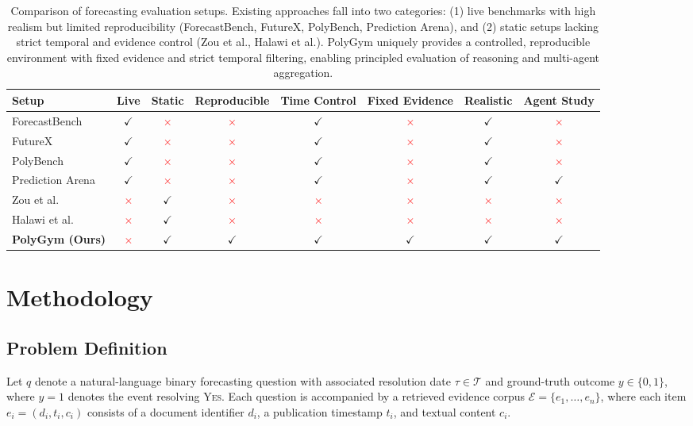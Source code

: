 \documentclass[11pt]{article}
\theoremstyle{definition}          %
\newcommand{\cmark}{\textcolor{green!60!black}{$\checkmark$}}
\newcommand{\xmark}{\textcolor{red}{$\times$}}
\begin{document}
\begin{table}[t]
\centering
\small
\begin{tabular}{lccccccc}
\toprule
\textbf{Setup} & \textbf{Live} & \textbf{Static} & \textbf{Reproducible} & \textbf{Time Control} & \textbf{Fixed Evidence} & \textbf{Realistic} & \textbf{Agent Study} \\
\midrule
ForecastBench~\citep{karger2024forecastbench} & \cmark & \xmark & \xmark & \cmark & \xmark & \cmark & \xmark \\
FutureX~\citep{zeng2025futurex} & \cmark & \xmark & \xmark & \cmark & \xmark & \cmark & \xmark \\
PolyBench~\citep{cheng2026polybench} & \cmark & \xmark & \xmark & \cmark & \xmark & \cmark & \xmark \\
Prediction Arena~\citep{zhang2026predictionarena} & \cmark & \xmark & \xmark & \cmark & \xmark & \cmark & \cmark \\
Zou et al.~\citep{zou2022forecasting} & \xmark & \cmark & \xmark & \xmark & \xmark & \xmark & \xmark \\
Halawi et al.~\citep{halawi2024approaching} & \xmark & \cmark & \xmark & \xmark & \xmark & \xmark & \xmark \\
\midrule
\textbf{PolyGym (Ours)} & \xmark & \cmark & \cmark & \cmark & \cmark & \cmark & \cmark \\
\bottomrule
\end{tabular}
\caption{
Comparison of forecasting evaluation setups.
Existing approaches fall into two categories: (1) live benchmarks with high realism but limited reproducibility (ForecastBench, FutureX, PolyBench, Prediction Arena), and (2) static setups lacking strict temporal and evidence control (Zou et al., Halawi et al.).
PolyGym uniquely provides a controlled, reproducible environment with fixed evidence and strict temporal filtering, enabling principled evaluation of reasoning and multi-agent aggregation.
}
\end{table}

\section{Methodology}
\subsection{Problem Definition}
Let $q$ denote a natural-language binary forecasting question with associated resolution
date $\tau \in \mathcal{T}$ and ground-truth outcome $y \in \{0,1\}$, where $y=1$ denotes
the event resolving \textsc{Yes}.
Each question is accompanied by a retrieved evidence corpus
$\mathcal{E} = \{e_1, \dots, e_n\}$, where each item $e_i = (d_i, t_i, c_i)$ consists of
a document identifier $d_i$, a publication timestamp $t_i$, and textual content $c_i$.
\end{document}

